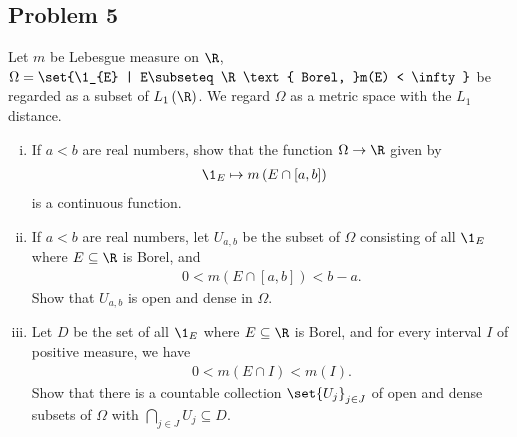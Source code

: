 \documentclass[10pt]{mypackage}
\begin{document}
\subsection{Problem 5}%
\begin{problem}
  Let $m$ be Lebesgue measure on $\R$, $\Omega = \set{\1_{E} | E\subseteq \R\text{ Borel, }m(E) < \infty}$ be regarded as a subset of $L_1\left( \R \right)$. We regard $\Omega$ as a metric space with the $L_1$ distance.
  \begin{enumerate}[(i)]
    \item If $a < b$ are real numbers, show that the function $\Omega\rightarrow \R$ given by
      \begin{align*}
        \1_{E} &\mapsto m\left( E\cap [a,b] \right)
      \end{align*}
      is a continuous function.
    \item If $a < b$ are real numbers, let $U_{a,b}$ be the subset of $\Omega$ consisting of all $\1_{E}$ where $E\subseteq \R$ is Borel, and
      \begin{align*}
        0 < m\left( E\cap [a,b] \right) < b-a.
      \end{align*}
      Show that $U_{a,b}$ is open and dense in $\Omega$.
    \item Let $D$ be the set of all $\1_{E}$ where $E\subseteq \R$ is Borel, and for every interval $I$ of positive measure, we have
      \begin{align*}
        0 < m\left( E\cap I \right) < m\left( I \right).
      \end{align*}
      Show that there is a countable collection $\set{U_j}_{j\in J}$ of open and dense subsets of $\Omega$ with $\bigcap_{j\in J}U_j \subseteq D$.
  \end{enumerate}
\end{problem}
\end{document}
